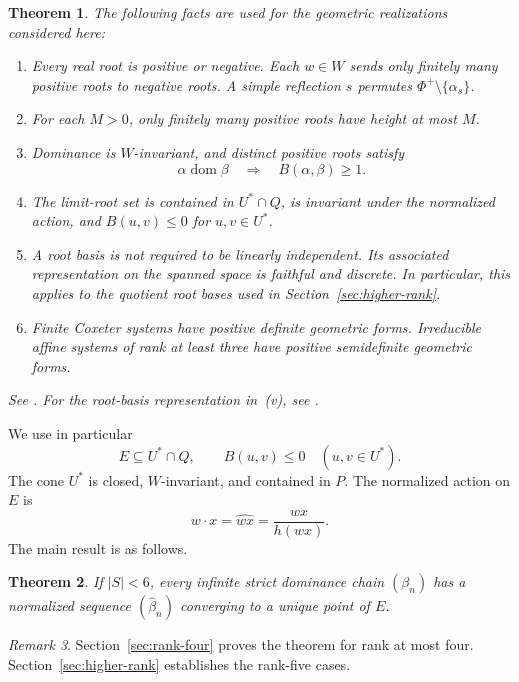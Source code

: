 \documentclass[11pt,reqno]{amsart}
\theoremstyle{plain}
\newtheorem{theorem}{Theorem}[section]
\theoremstyle{definition}
\theoremstyle{remark}
\newtheorem{remark}[theorem]{Remark}
\numberwithin{equation}{section}
\DeclareMathOperator{\dom}{dom}
\begin{document}
\begin{theorem}\label{thm:root-facts}
The following facts are used for the geometric realizations considered here:
\begin{enumerate}
\item Every real root is positive or negative. Each $w\in W$ sends only finitely many positive roots to negative roots. A simple reflection $s$ permutes $\Phi^+\setminus\{\alpha_s\}$.
\item For each $M>0$, only finitely many positive roots have height at most $M$.
\item Dominance is $W$-invariant, and distinct positive roots satisfy
\[
\alpha\dom\beta\quad\Longrightarrow\quad B(\alpha,\beta)\geq1.
\]
\item The limit-root set is contained in $U^*\cap Q$, is invariant under the normalized action, and $B(u,v)\leq0$ for $u,v\in U^*$.
\item A root basis is not required to be linearly independent. Its associated representation on the spanned space is faithful and discrete. In particular, this applies to the quotient root bases used in Section~\ref{sec:higher-rank}.
\item Finite Coxeter systems have positive definite geometric forms. Irreducible affine systems of rank at least three have positive semidefinite geometric forms.
\end{enumerate}
See \cite{DHR,Fu2013,FuEtAl2026,Krammer2009,Cashen}. For the root-basis representation in~(v), see \cite[Theorem~1.2.2 and Proposition~6.1.3]{Krammer2009}.
\end{theorem}

We use in particular
\begin{equation}\label{eq:cone-facts}
E\subseteq U^*\cap Q,\qquad B(u,v)\leq0\quad(u,v\in U^*).
\end{equation}
The cone $U^*$ is closed, $W$-invariant, and contained in $P$. The normalized action on $E$ is
\[
w\cdot x=\widehat{wx}=\frac{wx}{h(wx)}.
\]
The main result is as follows.
\begin{theorem}\label{thm:main}
If $|S|<6$, every infinite strict dominance chain $(\beta_n)$ has a normalized sequence $(\widehat{\beta}_n)$ converging to a unique point of $E$.
\end{theorem}

\begin{remark}
Section~\ref{sec:rank-four} proves the theorem for rank at most four.
Section~\ref{sec:higher-rank} establishes the rank-five cases.
\end{remark}
\end{document}
